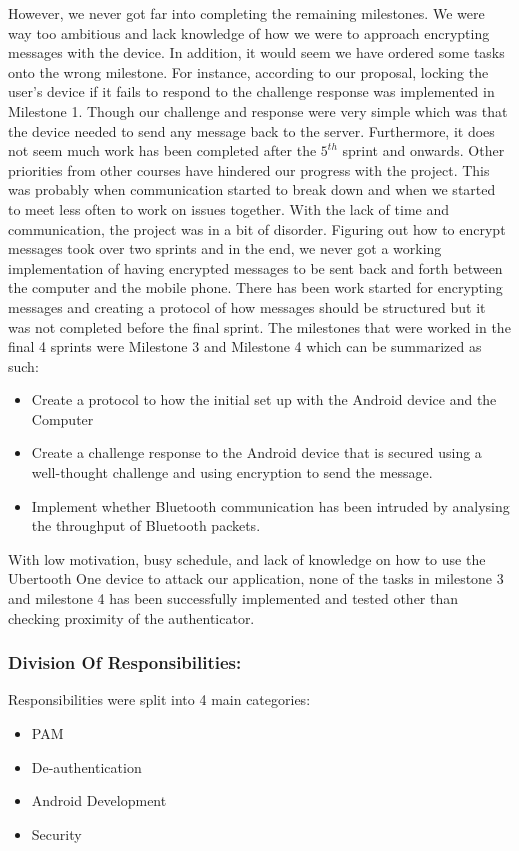 \documentclass[letterpaper,twocolumn,10pt]{article}
\begin{document}
{{However, we never got far into completing the remaining milestones. We were way too ambitious and lack knowledge of how we were to approach encrypting messages with the device. In addition, it would seem we have ordered some tasks onto the wrong milestone. For instance, according to our proposal, locking the user's device if it fails to respond to the challenge response was implemented in Milestone 1. Though our challenge and response were very simple which was that the device needed to send any message back to the server. Furthermore, it does not seem much work has been completed after the $5^{th}$ sprint and onwards. Other priorities from other courses have hindered our progress with the project. This was probably when communication started to break down and when we started to meet less often to work on issues together. With the lack of time and communication, the project was in a bit of disorder. Figuring out how to encrypt messages took over two sprints and in the end, we never got a working implementation of having encrypted messages to be sent back and forth between the computer and the mobile phone. There has been work started for encrypting messages and creating a protocol of how messages should be structured but it was not completed before the final sprint. The milestones that were worked in the final 4 sprints were Milestone 3 and Milestone 4 which can be summarized as such:
\begin{singlespacing}
\begin{itemize}
\item Create a protocol to how the initial set up with the Android device and the Computer
\item Create a challenge response to the Android device that is secured using a well-thought challenge and using encryption to send the message.
\item Implement whether Bluetooth communication has been intruded by analysing the throughput of Bluetooth packets.
\end{itemize}
\end{singlespacing}

With low motivation, busy schedule, and lack of knowledge on how to use the Ubertooth One device to attack our application, none of the tasks in milestone 3 and milestone 4 has been successfully implemented and tested other than checking proximity of the authenticator.

\subsubsection{Division Of Responsibilities:}
Responsibilities were split into 4 main categories:
\begin{itemize}[noitemsep]
\item PAM
\item De-authentication
\item Android Development
\item Security
\end{itemize}

}}
\end{document}

